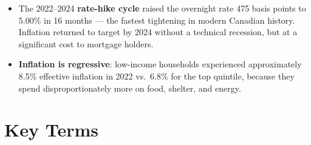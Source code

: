\begin{itemize}
  \item The 2022--2024 \textbf{rate-hike cycle} raised the overnight rate
        475 basis points to 5.00\% in 16 months --- the fastest tightening
        in modern Canadian history. Inflation returned to target by 2024
        without a technical recession, but at a significant cost to
        mortgage holders.

  \item \textbf{Inflation is regressive}: low-income households experienced
        approximately 8.5\% effective inflation in 2022 vs.\ 6.8\% for
        the top quintile, because they spend disproportionately more on
        food, shelter, and energy.
\end{itemize}

\section*{Key Terms}

